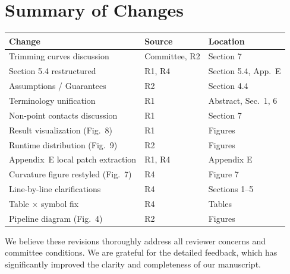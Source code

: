 \documentclass{article}
\begin{document}

\section*{Summary of Changes}

\vspace{0.3em}
\begin{center}
\small
\begin{tabular}{@{}p{6.2cm}lp{3.2cm}@{}}
\toprule
\textbf{Change} & \textbf{Source} & \textbf{Location} \\
\midrule
Trimming curves discussion          & Committee, R2 & Section 7 \\
Section 5.4 restructured            & R1, R4        & Section 5.4, App.~E \\
Assumptions / Guarantees            & R2            & Section 4.4 \\
Terminology unification             & R1            & Abstract, Sec.~1, 6 \\
Non-point contacts discussion       & R1            & Section 7 \\
Result visualization (Fig.~8)       & R1            & Figures \\
Runtime distribution (Fig.~9)       & R2            & Figures \\
Appendix~E local patch extraction   & R1, R4        & Appendix E \\
Curvature figure restyled (Fig.~7)  & R4            & Figure 7 \\
Line-by-line clarifications         & R4            & Sections 1--5 \\
Table $\times$ symbol fix           & R4            & Tables \\
Pipeline diagram (Fig.~4)           & R2            & Figures  \\
\bottomrule
\end{tabular}
\end{center}

\vspace{1.5em}
\noindent We believe these revisions thoroughly address all reviewer concerns and committee conditions. We are grateful for the detailed feedback, which has significantly improved the clarity and completeness of our manuscript.
\end{document}
